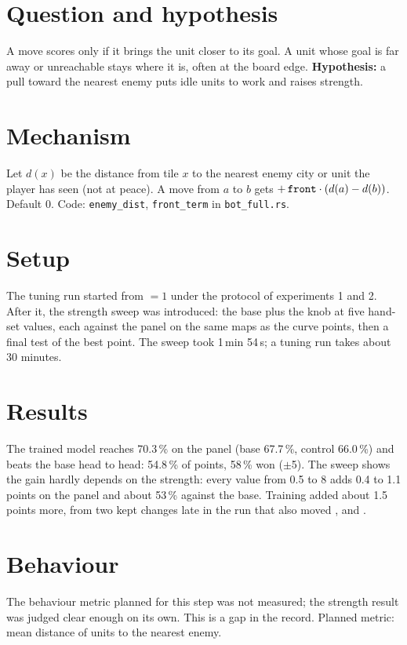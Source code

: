 \documentclass{../polyexp}
\begin{document}

\ExpHeader

\section{Question and hypothesis}
A move scores only if it brings the unit closer to its goal. A unit whose goal is far away or unreachable stays where it is, often at the board edge. \textbf{Hypothesis:} a pull toward the nearest enemy puts idle units to work and raises strength.

\section{Mechanism}
Let $d(x)$ be the distance from tile $x$ to the nearest enemy city or unit the player has seen (not at peace). A move from $a$ to $b$ gets $+\,\texttt{front}\cdot(d(a)-d(b))$. Default 0. Code: \texttt{enemy\_dist}, \texttt{front\_term} in \texttt{bot\_full.rs}.

\section{Setup}
The tuning run started from  $=1$ under the protocol of experiments 1 and 2. After it, the strength sweep was introduced: the base plus the knob at five hand-set values, each against the panel on the same maps as the curve points, then a final test of the best point. The sweep took 1\,min 54\,s; a tuning run takes about 30 minutes.

\section{Results}
\ExpResults

The trained model reaches 70.3\,\% on the panel (base 67.7\,\%, control 66.0\,\%) and beats the base head to head: 54.8\,\% of points, 58\,\% won ($\pm$5). The sweep shows the gain hardly depends on the strength: every value from 0.5 to 8 adds 0.4 to 1.1 points on the panel and about 53\,\% against the base. Training added about 1.5 points more, from two kept changes late in the run that also moved ,  and .

\section{Behaviour}
The behaviour metric planned for this step was not measured; the strength result was judged clear enough on its own. This is a gap in the record. Planned metric: mean distance of units to the nearest enemy.
\end{document}
